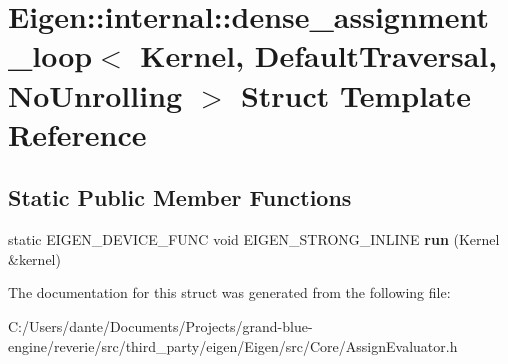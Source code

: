 \hypertarget{struct_eigen_1_1internal_1_1dense__assignment__loop_3_01_kernel_00_01_default_traversal_00_01_no_unrolling_01_4}{}\section{Eigen\+::internal\+::dense\+\_\+assignment\+\_\+loop$<$ Kernel, Default\+Traversal, No\+Unrolling $>$ Struct Template Reference}
\label{struct_eigen_1_1internal_1_1dense__assignment__loop_3_01_kernel_00_01_default_traversal_00_01_no_unrolling_01_4}
\subsection*{Static Public Member Functions}
\begin{DoxyCompactItemize}
\item 
\mbox{\label{struct_eigen_1_1internal_1_1dense__assignment__loop_3_01_kernel_00_01_default_traversal_00_01_no_unrolling_01_4_a8704abbb9459a7b5c0b6f52e4f9b089d}} 
static E\+I\+G\+E\+N\+\_\+\+D\+E\+V\+I\+C\+E\+\_\+\+F\+U\+NC void E\+I\+G\+E\+N\+\_\+\+S\+T\+R\+O\+N\+G\+\_\+\+I\+N\+L\+I\+NE {\bfseries run} (Kernel \&kernel)
\end{DoxyCompactItemize}


The documentation for this struct was generated from the following file\+:\begin{DoxyCompactItemize}
\item 
C\+:/\+Users/dante/\+Documents/\+Projects/grand-\/blue-\/engine/reverie/src/third\+\_\+party/eigen/\+Eigen/src/\+Core/Assign\+Evaluator.\+h\end{DoxyCompactItemize}
